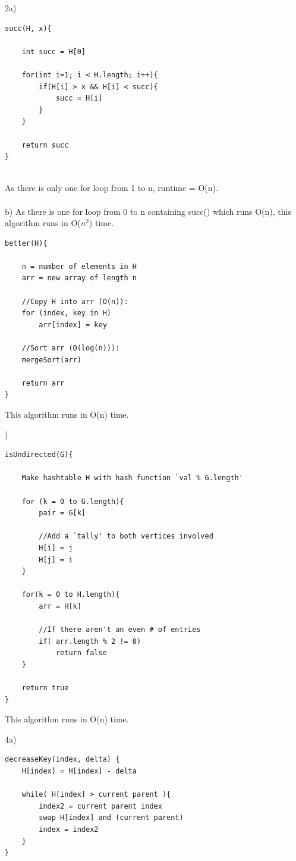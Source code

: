 \documentclass[12pt]{article}
\begin{document}
\noindent 2a)
\begin{lstlisting}[label=some-code]
succ(H, x){

    int succ = H[0]
    
    for(int i=1; i < H.length; i++){
        if(H[i] > x && H[i] < succ){
            succ = H[i]
        }
    }
    
    return succ
}
	
\end{lstlisting}
As there is only one for loop from 1 to n, runtime = O(n).\\\\

\noindent b) As there is one for loop from 0 to n containing succ() which runs O(n), this algorithm runs in O($n^2$) time.
\begin{lstlisting}[label=some-code]
better(H){
    
    n = number of elements in H
    arr = new array of length n
    
    //Copy H into arr (O(n)):
    for (index, key in H)
    	arr[index] = key

    //Sort arr (O(log(n))):
    mergeSort(arr)
    
    return arr
}
\end{lstlisting}
This algorithm runs in O(n) time.
\pagebreak

)
\begin{lstlisting}[label=some-code]
isUndirected(G){
    
    Make hashtable H with hash function `val % G.length'
    
    for (k = 0 to G.length){
        pair = G[k]
        
        //Add a `tally' to both vertices involved
        H[i] = j
        H[j] = i
    }
    
    for(k = 0 to H.length){
        arr = H[k]
        
        //If there aren't an even # of entries
        if( arr.length % 2 != 0)
            return false
    }
    
    return true
}
\end{lstlisting}
This algorithm runs in O(n) time.
\pagebreak

\noindent 4a)
\begin{lstlisting}[label=some-code]
decreaseKey(index, delta) {
    H[index] = H[index] - delta
    
    while( H[index] > current parent ){
    	index2 = current parent index
    	swap H[index] and (current parent)
    	index = index2 
    }
}
\end{lstlisting}
\end{document}
